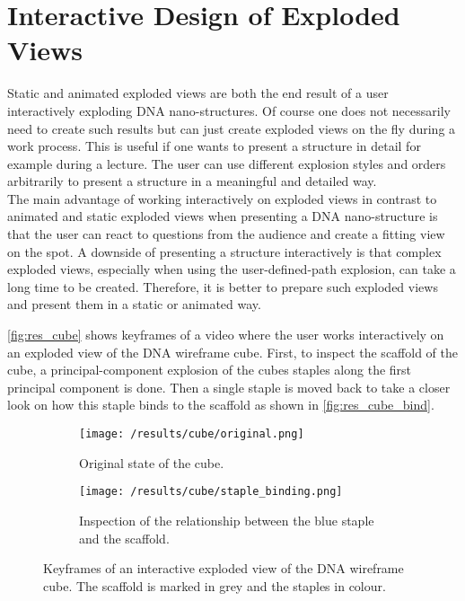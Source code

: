 \documentclass[draft,final]{vutinfth} %
\begin{document}
\section{Interactive Design of Exploded Views}
\label{sec:interactEV}

Static and animated exploded views are both the end result of a user interactively exploding DNA nano-structures. Of course one does not necessarily need to create such results but can just create exploded views on the fly during a work process. This is useful if one wants to present a structure in detail for example during a lecture. The user can use different explosion styles and orders arbitrarily to present a structure in a meaningful and detailed way. 
\\ The main advantage of working interactively on exploded views in contrast to animated and static exploded views when presenting a DNA nano-structure is that the user can react to questions from the audience and create a fitting view on the spot. A downside of presenting a structure interactively is that complex exploded views, especially when using the user-defined-path explosion, can take a long time to be created. Therefore, it is better to prepare such exploded views and present them in a static or animated way.

\par \autoref{fig:res_cube} shows keyframes of a video where the user works interactively on an exploded view of the DNA wireframe cube. First, to inspect the scaffold of the cube, a principal-component explosion of the cubes staples along the first principal component is done. Then a single staple is moved back to take a closer look on how this staple binds to the scaffold as shown in \autoref{fig:res_cube_bind}.

\begin{figure}
\centering
\begin{subfigure}{0.45\textwidth}
  \centering
  \texttt{[image: /results/cube/original.png]}
  \caption{Original state of the cube.}
  \label{fig:res_cube_o}
\end{subfigure}%
\quad
\begin{subfigure}{0.5\textwidth}
  \centering
  \texttt{[image: /results/cube/staple\_binding.png]}
  \caption{Inspection of the relationship between the blue staple and the scaffold.}
  \label{fig:res_cube_bind}
\end{subfigure}%

\caption{Keyframes of an interactive exploded view of the DNA wireframe cube. The scaffold is marked in grey and the staples in colour.}
\label{fig:res_cube}
\end{figure}
\end{document}

